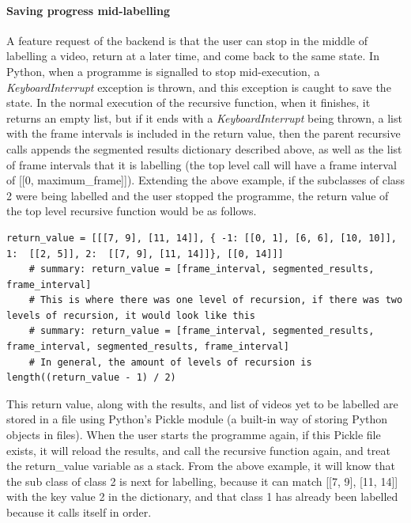     \paragraph{Saving progress mid-labelling}
    A feature request of the backend is that the user can stop in the middle of labelling a video, return at a later time, and come back to the same state. In Python, when a programme is signalled to stop mid-execution, a {\slshape KeyboardInterrupt} exception is thrown, and this exception is caught to save the state. In the normal execution of the recursive function, when it finishes, it returns an empty list, but if it ends with a {\slshape KeyboardInterrupt} being thrown, a list with the frame intervals is included in the return value, then the parent recursive calls appends the segmented results dictionary described above, as well as the list of frame intervals that it is labelling (the top level call will have a frame interval of [[0, maximum\_frame]]). Extending the above example, if the subclasses of class 2 were being labelled and the user stopped the programme, the return value of the top level recursive function would be as follows.

    \begin{lstlisting}[style=PythonStyle]
    return_value = [[[7, 9], [11, 14]], { -1: [[0, 1], [6, 6], [10, 10]], 1:  [[2, 5]], 2:  [[7, 9], [11, 14]]}, [[0, 14]]]
    # summary: return_value = [frame_interval, segmented_results, frame_interval]
    # This is where there was one level of recursion, if there was two levels of recursion, it would look like this
    # summary: return_value = [frame_interval, segmented_results, frame_interval, segmented_results, frame_interval]
    # In general, the amount of levels of recursion is length((return_value - 1) / 2)\end{lstlisting}

    This return value, along with the results, and list of videos yet to be labelled are stored in a file using Python's Pickle module (a built-in way of storing Python objects in files). When the user starts the programme again, if this Pickle file exists, it will reload the results, and call the recursive function again, and treat the return\_value variable as a stack. From the above example, it will know that the sub class of class 2 is next for labelling, because it can match [[7, 9], [11, 14]] with the key value 2 in the dictionary, and that class 1 has already been labelled because it calls itself in order.

